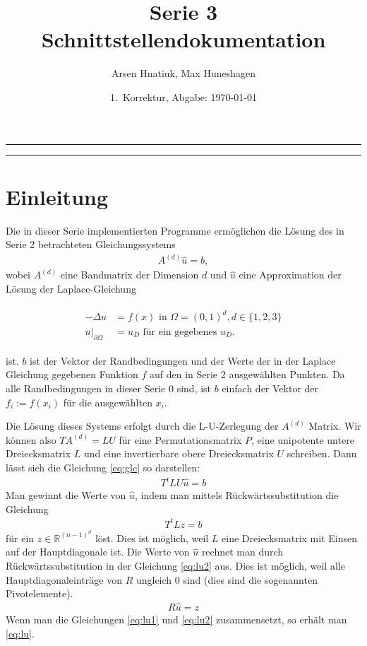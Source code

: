 \documentclass[letterpaper,10pt,ngerman, oneside, openright]{sphinxmanual}
\title{Serie 3 Schnittstellendokumentation}
\date{1.~Korrektur, Abgabe: \today}
\author{Arsen Hnatiuk, Max Huneshagen}
\begin{document}
\maketitle
\tableofcontents
\bigskip

\hrule
\hrule


\chapter{Einleitung}

Die in dieser Serie implementierten Programme ermöglichen die Lösung des in Serie 2 betrachteten Gleichungssystems
\begin{align}
A^{(d)}\hat{u} = b,
\label{eq:glc}
\end{align}
wobei $A^{(d)}$ eine Bandmatrix der Dimension $d$ und $\hat{u}$ eine Approximation der Lösung der Laplace-Gleichung

\begin{align}
\begin{split}
-\Delta u&=f(x)\text{ in }\Omega=(0, 1)^d, d\in\{1,2,3\}\\
u \vert _{\partial\Omega}&=u_D\text{ für ein gegebenes }u_D.
\end{split}
\label{eq:rwp}
\end{align}


ist. $b$ ist der Vektor der Randbedingungen und der Werte der in der Laplace Gleichung gegebenen Funktion $f$ auf den in Serie 2 ausgewählten Punkten. Da alle Randbedingungen in dieser Serie $0$ sind, ist $b$ einfach der Vektor der $f_i := f(x_i)$ für die ausgewählten $x_i$. 

Die Lösung dieses Systems erfolgt durch die L-U-Zerlegung der $A^{(d)}$ Matrix. Wir können also $TA^{(d)}=LU$ für eine Permutationsmatrix $P$, eine unipotente untere Dreiecksmatrix $L$ und eine invertierbare obere Dreiecksmatrix $U$ schreiben. Dann lässt sich die Gleichung \ref{eq:glc} so darstellen:
\begin{align}
T^tLU\hat{u}=b
\label{eq:lu}
\end{align}
Man gewinnt die Werte von $\hat{u}$, indem man mittels Rückwärtssubstitution die Gleichung 
\begin{align}
T^tLz=b
\label{eq:lu1}
\end{align}
für ein $z\in \mathbb{R}^{(n-1)^d}$ löst. Dies ist möglich, weil $L$ eine Dreiecksmatrix mit Einsen auf der Hauptdiagonale ist. Die Werte von $\hat{u}$ rechnet man durch Rückwärtssubstitution in der Gleichung \eqref{eq:lu2} aus. Dies ist möglich, weil alle Hauptdiagonaleinträge von $R$ ungleich $0$ sind (dies sind die sogenannten Pivotelemente).
\begin{align}
R\hat{u}=z
\label{eq:lu2}
\end{align}
Wenn man die Gleichungen \eqref{eq:lu1} und \eqref{eq:lu2} zusammensetzt, so erhält man \eqref{eq:lu}.
\end{document}

